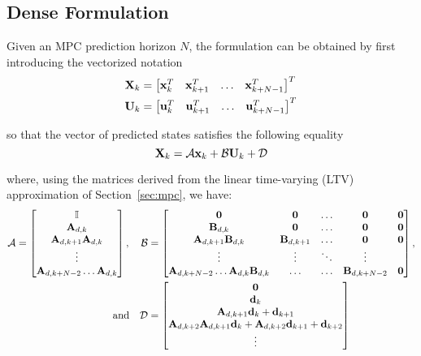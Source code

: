 \documentclass[../main.tex]{subfiles}
\begin{document}
\pagebreak
\subsection{Dense Formulation}\label{app:dense-formulation}

Given an MPC prediction horizon $N$, the  formulation can be obtained by first
introducing the vectorized notation
\begin{equation*}
	\begin{aligned}
		\mathbf{X}_k &= \begin{bmatrix}
			 \mathbf{x}_k^T &  \mathbf{x}_{k+1}^T & \ldots & 
			\mathbf{x}_{k+N-1}^T
		\end{bmatrix}^T\\
		\mathbf{U}_k &= \begin{bmatrix}
			 \mathbf{u}_k^T &  \mathbf{u}_{k+1}^T & \ldots & 
			\mathbf{u}_{k+N-1}^T
		\end{bmatrix}^T
	\end{aligned}
\end{equation*}

so that the vector of predicted states satisfies the following equality
\begin{equation}\label{eq:vectorized-states}
	\mathbf{X}_k = \mathcal{A} \mathbf{x}_k + \mathcal{B} \mathbf{U}_k + \mathcal{D}	
\end{equation}

where, using the matrices derived from the linear time-varying (LTV)
approximation of Section~\ref{sec:mpc}, we have:
\begin{equation*}
	\begin{aligned}
	\mathcal{A} = \begin{bmatrix}
		\mathbb{I}\\
		\mathbf{A}_{d,k}\\
		\mathbf{A}_{d,k+1} \mathbf{A}_{d,k}\\
		\vdots\\
		\mathbf{A}_{d,k+N-2} \ldots \mathbf{A}_{d,k}
	\end{bmatrix}, 
	\quad
	\mathcal{B} &= \begin{bmatrix}
		\mathbf{0} & \mathbf{0} & \ldots & \mathbf{0} & \mathbf{0}\\
		\mathbf{B}_{d,k} & \mathbf{0} & \ldots & \mathbf{0} & \mathbf{0}\\
		\mathbf{A}_{d,k+1} \mathbf{B}_{d,k} & \mathbf{B}_{d,k+1} & \ldots & \mathbf{0} & \mathbf{0}\\
		\vdots & \vdots & \ddots & \vdots\\
		\mathbf{A}_{d,k+N-2} \ldots \mathbf{A}_{d,k} \mathbf{B}_{d,k} & \ldots & \ldots &
		\mathbf{B}_{d,k+N-2} & \mathbf{0}
	\end{bmatrix},\\
		\text{and}\quad \mathcal{D} &= \begin{bmatrix}
		\mathbf{0}\\
		\mathbf{d}_k\\
		\mathbf{A}_{d,k+1} \mathbf{d}_k + \mathbf{d}_{k+1}\\
		\mathbf{A}_{d,k+2} \mathbf{A}_{d,k+1} \mathbf{d}_k + \mathbf{A}_{d,k+2}
		\mathbf{d}_{k+1} + \mathbf{d}_{k+2}\\
		\vdots
	\end{bmatrix}
	\end{aligned}
\end{equation*}
\end{document}
